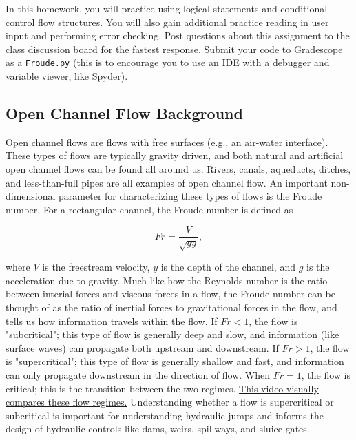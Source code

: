 \documentclass{homework}
\begin{document}
\maketitle

In this homework, you will practice using logical statements and conditional control flow structures. You will also gain additional practice reading in user input and performing error checking. Post questions about this assignment to the class discussion board for the fastest response. Submit your code to Gradescope as a \texttt{Froude.py} (this is to encourage you to use an IDE with a debugger and variable viewer, like Spyder).

\subsection*{Open Channel Flow Background}
Open channel flows are flows with free surfaces (e.g., an air-water interface). These types of flows are typically gravity driven, and both natural and artificial open channel flows can be found all around us. Rivers, canals, aqueducts, ditches, and less-than-full pipes are all examples of open channel flow. An important non-dimensional parameter for characterizing these types of flows is the Froude number. For a rectangular channel, the Froude number is defined as

\begin{equation}
    Fr = \frac{V}{\sqrt{gy}} ,
\end{equation}

 where $V$ is the freestream velocity, $y$ is the depth of the channel, and $g$ is the acceleration due to gravity. Much like how the Reynolds number is the ratio between interial forces and viscous forces in a flow, the Froude number can be thought of as the ratio of inertial forces to gravitational forces in the flow, and tells us how information travels within the flow. If $Fr < 1$, the flow is "subcritical"; this type of flow is generally deep and slow, and information (like surface waves) can propagate both upstream and downstream. If $Fr > 1$, the flow is "supercritical"; this type of flow is generally shallow and fast, and information can only propagate downstream in the direction of flow. When $Fr = 1$, the flow is critical; this is the transition between the two regimes. \href{https://www.youtube.com/watch?v=ObOmR5iXO04}{This video visually compares these flow regimes.} Understanding whether a flow is supercritical or subcritical is important for understanding hydraulic jumps and informs the design of hydraulic controls like dams, weirs, spillways, and sluice gates.
\end{document}
